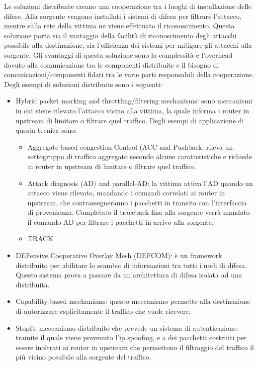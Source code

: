 Le soluzioni distribuite creano una cooperazione tra i luoghi di installazione delle difese. Alla sorgente vengono installati i sistemi di difesa per filtrare l'attacco, mentre sulla rete della vittima ne viene effettuato il riconoscimento. Questa soluzione porta sia il vantaggio della facilità di riconoscimento degli attacchi possibile alla destinazione, sia l'efficienza dei sistemi per mitigare gli attacchi alla sorgente.
Gli svantaggi di questa soluzione sono la complessità e l'overhead dovuto alla comunicazione tra le componenti distribuite e il bisogno di comunicazioni/componenti fidati tra le varie parti responsabili della cooperazione.
Degli esempi di soluzioni distribuite sono i seguenti:
\begin{itemize}
    \item Hybrid packet marking and throttling/filtering mechanisms: sono meccanismi in cui viene rilevato l'attacco vicino alla vittima, la quale informa i router in upstream di limitare o filtrare quel traffico. Degli esempi di applicazione di questa tecnica sono:
    \begin{itemize}
        \item Aggregate-based  congestion Control (ACC and Pushback: rileva un sottogruppo di traffico aggregato secondo alcune caratteristiche e richiede ai router in upstream di limitare o filtrare quel traffico.
        \item Attack diagnosis (AD) and parallel-AD: la vittima attiva l'AD quando un attacco viene rilevato, mandando i comandi correlati ai router in upstream, che contrassegneranno i pacchetti in transito con l'interfaccia di provenienza. Completato il traceback fino alla sorgente verrà mandato il comando AD per filtrare i pacchetti in arrivo alla sorgente.
        \item TRACK
    \end{itemize}
    \item DEFensive Cooperative Overlay Mesh (DEFCOM): è un framework distribuito per abilitare lo scambio di informazioni tra tutti i nodi di difesa. Questo sistema prova a passare da un'architettura di difesa isolata ad una distribuita.
    \item Capability-based mechanisms: questo meccanismo permette alla destinazione di autorizzare esplicitamente il traffico che vuole ricevere.
    \item StopIt: meccanismo distribuito che prevede un sistema di autenticazione: tramite il quale viene prevenuto l'ip spoofing, e a dei pacchetti costruiti per essere inoltrati ai router in upstream che permettono il filtraggio del traffico il più vicino possibile alla sorgente del traffico.

\end{itemize}

